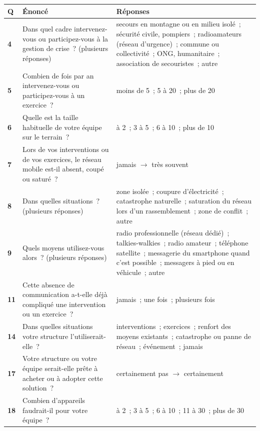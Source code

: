 \documentclass[11pt,a4paper]{article}
\newcommand{\qa}[1]{\textbf{\textcolor{insarouge}{#1}}}
\begin{document}
\begingroup\small\renewcommand{\arraystretch}{1.35}
\begin{tabularx}{\linewidth}{@{}p{0.9cm}>{\raggedright\arraybackslash}X>{\raggedright\arraybackslash}X@{}}
  \toprule
  \textbf{Q} & \textbf{Énoncé} & \textbf{Réponses} \\
  \midrule
  \qa{4} & Dans quel cadre intervenez-vous ou participez-vous à la gestion de crise~? (plusieurs réponses) &
      secours en montagne ou en milieu isolé~; sécurité civile, pompiers~; radioamateurs (réseau d'urgence)~; commune ou collectivité~; ONG, humanitaire~; association de secouristes~; autre \\
  \qa{5} & Combien de fois par an intervenez-vous ou participez-vous à un exercice~? &
      moins de 5~; 5 à 20~; plus de 20 \\
  \qa{6} & Quelle est la taille habituelle de votre équipe sur le terrain~? &
      1 à 2~; 3 à 5~; 6 à 10~; plus de 10 \\
  \qa{7} & Lors de vos interventions ou de vos exercices, le réseau mobile est-il absent, coupé ou saturé~? &
      jamais $\rightarrow$ très souvent \\
  \qa{8} & Dans quelles situations~? (plusieurs réponses) &
      zone isolée~; coupure d'électricité~; catastrophe naturelle~; saturation du réseau lors d'un rassemblement~; zone de conflit~; autre \\
  \qa{9} & Quels moyens utilisez-vous alors~? (plusieurs réponses) &
      radio professionnelle (réseau dédié)~; talkies-walkies~; radio amateur~; téléphone satellite~; messagerie du smartphone quand c'est possible~; messagers à pied ou en véhicule~; autre \\
  \qa{11} & Cette absence de communication a-t-elle déjà compliqué une intervention ou un exercice~? &
      jamais~; une fois~; plusieurs fois \\
  \qa{14} & Dans quelles situations votre structure l'utiliserait-elle~? &
      interventions~; exercices~; renfort des moyens existants~; catastrophe ou panne de réseau~; événement~; jamais \\
  \qa{17} & Votre structure ou votre équipe serait-elle prête à acheter ou à adopter cette solution~? &
      certainement pas $\rightarrow$ certainement \\
  \qa{18} & Combien d'appareils faudrait-il pour votre équipe~? &
      1 à 2~; 3 à 5~; 6 à 10~; 11 à 30~; plus de 30 \\
  \bottomrule
\end{tabularx}
\endgroup
\end{document}
